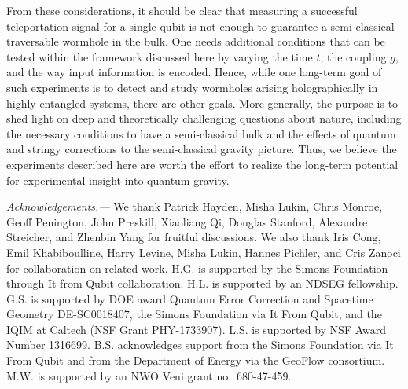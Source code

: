 \documentclass[aps,pra,reprint,floatfix,superscriptaddress, nofootinbib,longbibliography,onecolumn,notitlepage,12pt, tightenlines]{revtex4-1}
\newcommand{\ssection}[1]{\smallskip\phantomsection\addcontentsline{toc}{section}{#1}\textit{#1.---}}
\begin{document}
From these considerations, it should be clear that measuring a successful teleportation signal for a single qubit is not enough to guarantee a semi-classical traversable wormhole in the bulk. One needs additional conditions that can be tested within the framework discussed here by varying the time $t$, the coupling $g$, and the way input information is encoded. Hence, while one long-term goal of such experiments is to detect and study wormholes arising holographically in highly entangled systems, there are other goals. More generally, the purpose is to shed light on deep and theoretically challenging questions about nature, including the necessary conditions to have a semi-classical bulk and the effects of quantum and stringy corrections to the semi-classical gravity picture. Thus, we believe the experiments described here are worth the effort to realize the long-term potential for experimental insight into quantum gravity.


\ssection{Acknowledgements}
We thank Patrick Hayden, Misha Lukin, Chris Monroe, Geoff Penington, John Preskill, Xiaoliang Qi, Douglas Stanford, Alexandre Streicher, and Zhenbin Yang for fruitful discussions. We also thank Iris Cong, Emil Khabiboulline, Harry Levine, Misha Lukin, Hannes Pichler, and Cris Zanoci for collaboration on related work. H.G. is supported by the Simons Foundation through It from Qubit collaboration.
H.L. is supported by an NDSEG fellowship.
G.S. is supported by DOE award Quantum Error Correction and Spacetime Geometry DE-SC0018407, the Simons Foundation via It From Qubit, and the IQIM at Caltech (NSF Grant PHY-1733907).
L.S. is supported by NSF Award Number 1316699.
B.S. acknowledges support from the Simons Foundation via It From Qubit and from the Department of Energy via the GeoFlow consortium. M.W. is supported by an NWO Veni grant no.~680-47-459.


\end{document}
